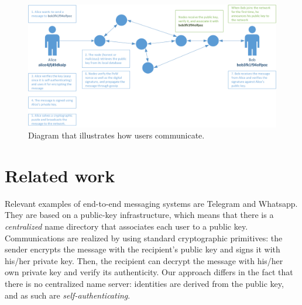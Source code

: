 \documentclass[a4paper,12pt]{article}
\begin{document}
\begin{itemize}
\end{itemize}

\begin{figure}[H]
	\centering{}
	\includegraphics[width=\textwidth]{img/figure.png}
	\caption{Diagram that illustrates how users communicate.}
	\label{fig:figure}
\end{figure}

\section{Related work} %
Relevant examples of end-to-end messaging systems are Telegram and Whatsapp. They are based on a public-key infrastructure, which means that there is a \emph{centralized} name directory that associates each user to a public key. Communications are realized by using standard cryptographic primitives: the sender encrypts the message with the recipient's public key and signs it with his/her private key. Then, the recipient can decrypt the message with his/her own private key and verify its authenticity. Our approach differs in the fact that there is no centralized name server: identities are derived from the public key, and as such are \emph{self-authenticating}.
\end{document}
